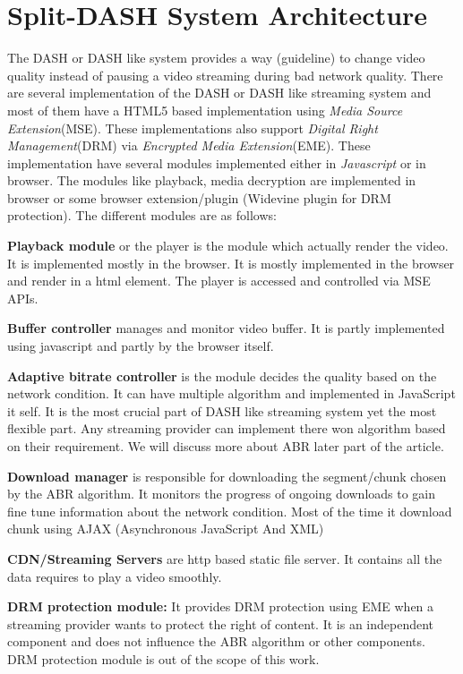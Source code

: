 \section{Split-DASH System Architecture}
The DASH or DASH like system provides a way (guideline) to change video quality instead of pausing a video streaming during bad network quality. There are several implementation of the DASH or DASH like streaming system and most of them have a HTML5 based implementation using {\it Media Source Extension}(MSE)\cite{wiki:dash,w3c:mse}. These implementations also support {\it Digital Right Management}(DRM) via {\it Encrypted Media Extension}(EME)\cite{w3c:eme}. These implementation have several modules implemented either in {\it Javascript} or in browser. The modules like playback, media decryption are implemented in browser or some browser extension/plugin (\ie Widevine plugin for DRM protection). The different modules are as follows:

{\bf Playback module} or the player is the module which actually render the video. It is implemented mostly in the browser. It is mostly implemented in the browser and render in a html element. The player is accessed and controlled via MSE APIs.

{\bf Buffer controller} manages and monitor video buffer. It is partly implemented using javascript and partly by the browser itself.

{\bf Adaptive bitrate controller} is the module decides the quality based on the network condition. It can have multiple algorithm and implemented in JavaScript it self. It is the most crucial part of DASH like streaming system yet the most flexible part. Any streaming provider can implement there won algorithm based on their requirement. We will discuss more about ABR later part of the article.

{\bf Download manager} is responsible for downloading the segment/chunk chosen by the ABR algorithm. It monitors the progress of ongoing downloads to gain fine tune information about the network condition. Most of the time it download chunk using AJAX (Asynchronous JavaScript And XML)


{\bf CDN/Streaming Servers} are http based static file server. It contains all the data requires to play a video smoothly.

{\bf DRM protection module:} It provides DRM protection using EME when a streaming provider wants to protect the right of content. It is an independent component and does not influence the ABR algorithm or other components. DRM protection module is out of the scope of this work.


